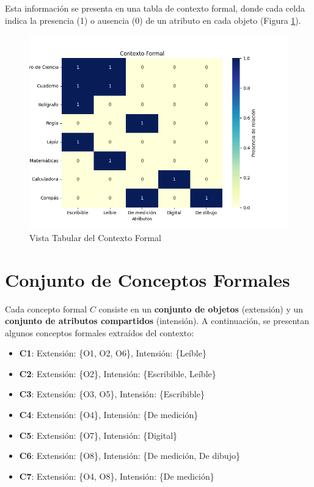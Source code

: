Esta información se presenta en una tabla de contexto formal, donde cada celda indica la presencia (1) o ausencia (0) de un atributo en cada objeto (Figura \ref{fig:tabular_view}).

\begin{figure}[H]
  \centering
  \includegraphics[width=\textwidth]{Figures/1. Content/tabular_view.png}
  \caption{Vista Tabular del Contexto Formal}
  \label{fig:tabular_view}
\end{figure}

\section{Conjunto de Conceptos Formales}

Cada concepto formal \( C \) consiste en un \textbf{conjunto de objetos} (extensión) y un \textbf{conjunto de atributos compartidos} (intensión). A continuación, se presentan algunos conceptos formales extraídos del contexto:

\begin{itemize}
    \item \textbf{C1}: Extensión: \{O1, O2, O6\}, Intensión: \{Leíble\}
    \item \textbf{C2}: Extensión: \{O2\}, Intensión: \{Escribible, Leíble\}
    \item \textbf{C3}: Extensión: \{O3, O5\}, Intensión: \{Escribible\}
    \item \textbf{C4}: Extensión: \{O4\}, Intensión: \{De medición\}
    \item \textbf{C5}: Extensión: \{O7\}, Intensión: \{Digital\}
    \item \textbf{C6}: Extensión: \{O8\}, Intensión: \{De medición, De dibujo\}
    \item \textbf{C7}: Extensión: \{O4, O8\}, Intensión: \{De medición\}
\end{itemize}

